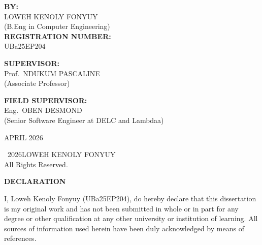 \documentclass[12pt,a4paper]{report}
\begin{document}
\begin{titlepage}
{\large\bfseries BY:}\\[0.1cm]
LOWEH KENOLY FONYUY\\
(B.Eng in Computer Engineering)\\[0.2cm]

{\large\bfseries REGISTRATION NUMBER:}\\[0.2cm]
UBa25EP204\\[0.4cm]

\noindent
\begin{minipage}[t]{0.48\textwidth}
 \centering
 {\large\bfseries SUPERVISOR:}\\[0.2cm]
 Prof.\ NDUKUM PASCALINE\\[0.1cm]
 (Associate Professor)
\end{minipage}%
\hfill
\begin{minipage}[t]{0.48\textwidth}
 \centering
 {\large\bfseries FIELD SUPERVISOR:}\\
 Eng.\ OBEN DESMOND\\
 (Senior Software Engineer at DELC and Lambdaa)
\end{minipage}

\vfill

{\large APRIL 2026}

\vspace{0.5cm}
\end{titlepage}

\clearpage
\thispagestyle{plain}
\null\vfill
\begin{center}
\textcopyright~2026\quad LOWEH KENOLY FONYUY\\[0.5cm]
All Rights Reserved.
\end{center}
\vspace{1.5cm}

\clearpage
\begin{center}
{\Large\bfseries DECLARATION}
\end{center}
\vspace{1cm}

I, Loweh Kenoly Fonyuy (UBa25EP204), do hereby declare that this dissertation is my original work and has not been submitted in whole or in part for any degree or other qualification at any other university or institution of learning. All sources of information used herein have been duly acknowledged by means of references.
\end{document}
